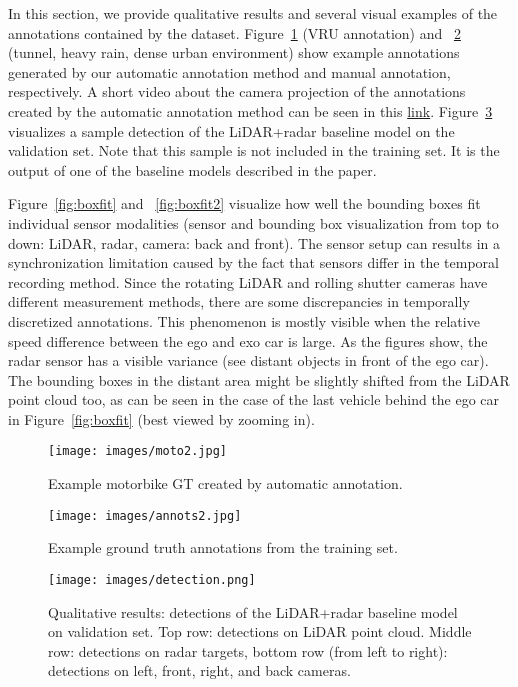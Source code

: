 \documentclass{article}
\begin{document}
In this section, we provide qualitative results and several visual examples of the annotations contained by the dataset. Figure~\ref{fig:ann} (VRU annotation) and ~\ref{fig:annots2} (tunnel, heavy rain, dense urban environment) show example annotations generated by our automatic annotation method and manual annotation, respectively. A short video about the camera projection of the annotations created by the automatic annotation method can be seen in this \href{https://adasworks-my.sharepoint.com/:v:/g/personal/tamas_matuszka_aimotive_com1/EY8VeetDvL5PjZx6t7DUQlkBx0Dihh5-Ww5CCmzhiCz61w?e=3O43Ex}{link}. Figure~\ref{fig:detection} visualizes a sample detection of the LiDAR+radar baseline model on the validation set. Note that this sample is not included in the training set. It is the output of one of the baseline models described in the paper.

Figure~\ref{fig:boxfit} and ~\ref{fig:boxfit2} visualize how well the bounding boxes fit individual sensor modalities (sensor and bounding box visualization from top to down: LiDAR, radar, camera: back and front). The sensor setup can results in a synchronization limitation caused by the fact that sensors differ in the temporal recording method. Since the rotating LiDAR and rolling shutter cameras have different measurement methods, there are some discrepancies in temporally discretized annotations. This phenomenon is mostly visible when the relative speed difference between the ego and exo car is large. As the figures show, the radar sensor has a visible variance (see distant objects in front of the ego car). The bounding boxes in the distant area might be slightly shifted from the LiDAR point cloud too, as can be seen in the case of the last vehicle behind the ego car in Figure~\ref{fig:boxfit} (best viewed by zooming in).

\begin{figure}[!h]
  \centering
  \texttt{[image: images/moto2.jpg]}
   \caption{Example motorbike GT created by automatic annotation.}
   \label{fig:ann}
\end{figure}

\begin{figure}
  \centering
   \texttt{[image: images/annots2.jpg]}

   \caption{Example ground truth annotations from the training set.}
   \label{fig:annots2}
\end{figure}


\begin{figure}[H]
  \centering
    \texttt{[image: images/detection.png]}

   \caption{Qualitative results: detections of the LiDAR+radar baseline model on validation set. Top row: detections on LiDAR point cloud. Middle row: detections on radar targets, bottom row (from left to right): detections on left, front, right, and back cameras.}
   \label{fig:detection}
\end{figure}
\end{document}
